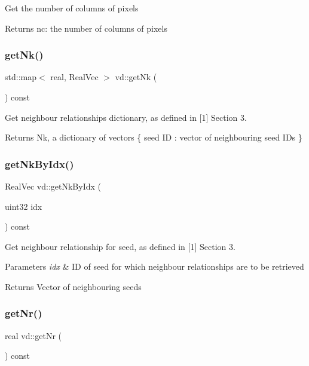Get the number of columns of pixels \begin{DoxyReturn}{Returns}
nc\+: the number of columns of pixels 
\end{DoxyReturn}
\mbox{\label{classvd_a90613fc46f246a5450e26487caff33f9}} 
\subsubsection{\texorpdfstring{get\+Nk()}{getNk()}}
{\footnotesize\ttfamily std\+::map$<$ real, Real\+Vec $>$ vd\+::get\+Nk (\begin{DoxyParamCaption}{ }\end{DoxyParamCaption}) const}

Get neighbour relationships dictionary, as defined in \mbox{[}1\mbox{]} Section 3. \begin{DoxyReturn}{Returns}
Nk, a dictionary of vectors \{ seed ID \+: vector of neighbouring seed I\+Ds \} 
\end{DoxyReturn}
\mbox{\label{classvd_a4d058d2d1d675a741a83776c95b2acfb}} 
\subsubsection{\texorpdfstring{get\+Nk\+By\+Idx()}{getNkByIdx()}}
{\footnotesize\ttfamily Real\+Vec vd\+::get\+Nk\+By\+Idx (\begin{DoxyParamCaption}\item[{uint32}]{idx }\end{DoxyParamCaption}) const}

Get neighbour relationship for seed, as defined in \mbox{[}1\mbox{]} Section 3. 
\begin{DoxyParams}{Parameters}
{\em idx} & ID of seed for which neighbour relationships are to be retrieved \\
\hline
\end{DoxyParams}
\begin{DoxyReturn}{Returns}
Vector of neighbouring seeds 
\end{DoxyReturn}
\mbox{\label{classvd_a1a1634d6906eb0af4d877c2af3292ca7}} 
\subsubsection{\texorpdfstring{get\+Nr()}{getNr()}}
{\footnotesize\ttfamily real vd\+::get\+Nr (\begin{DoxyParamCaption}{ }\end{DoxyParamCaption}) const}


